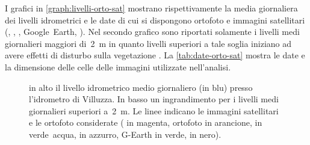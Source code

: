 I grafici in \vref{graph:livelli-orto-sat} mostrano rispettivamente la media giornaliera dei livelli idrometrici e le date di cui si dispongono ortofoto e immagini satellitari (\AST{}, \Pl{}, \Se{}, Google~Earth, \WV{}). 
Nel secondo grafico sono riportati solamente i livelli medi giornalieri maggiori di~\SI{2}{\m} in quanto livelli superiori a tale soglia iniziano ad avere effetti di disturbo sulla vegetazione .
La \vref{tab:date-orto-sat} mostra le date e la dimensione delle celle delle immagini utilizzate nell'analisi.
\begin{figure}[p]
	\centering
	
	
	\caption[livelli idrometrici e foto aeree - satellitari]{in alto il livello idrometrico medio giornaliero (in blu) presso l'idrometro di Villuzza. 
	In basso un ingrandimento per i livelli medi giornalieri superiori a~\SI{2}{\m}. Le linee indicano le immagini satellitari e le ortofoto considerate (\AST{} in magenta, ortofoto in arancione, \Pl{} in verde~acqua, \Se{} in azzurro, G-Earth in verde, \WV{} in nero).}
	\label{graph:livelli-orto-sat}
\end{figure}
